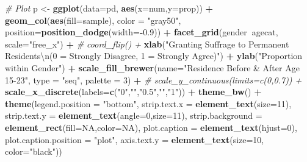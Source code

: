 \documentclass[
]{article}
\newenvironment{Shaded}{\begin{snugshade}}{\end{snugshade}}
\newcommand{\CharTok}[1]{\textcolor[rgb]{0.31,0.60,0.02}{#1}}
\newcommand{\CommentTok}[1]{\textcolor[rgb]{0.56,0.35,0.01}{\textit{#1}}}
\newcommand{\DataTypeTok}[1]{\textcolor[rgb]{0.13,0.29,0.53}{#1}}
\newcommand{\DecValTok}[1]{\textcolor[rgb]{0.00,0.00,0.81}{#1}}
\newcommand{\FloatTok}[1]{\textcolor[rgb]{0.00,0.00,0.81}{#1}}
\newcommand{\KeywordTok}[1]{\textcolor[rgb]{0.13,0.29,0.53}{\textbf{#1}}}
\newcommand{\NormalTok}[1]{#1}
\newcommand{\OperatorTok}[1]{\textcolor[rgb]{0.81,0.36,0.00}{\textbf{#1}}}
\newcommand{\OtherTok}[1]{\textcolor[rgb]{0.56,0.35,0.01}{#1}}
\newcommand{\StringTok}[1]{\textcolor[rgb]{0.31,0.60,0.02}{#1}}
\begin{document}
\begin{Shaded}
\begin{Highlighting}[]
\CommentTok{# Plot}
\NormalTok{p <-}\StringTok{ }\KeywordTok{ggplot}\NormalTok{(}\DataTypeTok{data=}\NormalTok{pd, }\KeywordTok{aes}\NormalTok{(}\DataTypeTok{x=}\NormalTok{num,}\DataTypeTok{y=}\NormalTok{prop)) }\OperatorTok{+}\StringTok{ }
\StringTok{  }\KeywordTok{geom_col}\NormalTok{(}\KeywordTok{aes}\NormalTok{(}\DataTypeTok{fill=}\NormalTok{sample), }\DataTypeTok{color =} \StringTok{"gray50"}\NormalTok{, }\DataTypeTok{position=}\KeywordTok{position_dodge}\NormalTok{(}\DataTypeTok{width=}\OperatorTok{-}\FloatTok{0.9}\NormalTok{)) }\OperatorTok{+}\StringTok{  }
\StringTok{  }\KeywordTok{facet_grid}\NormalTok{(gender}\OperatorTok{~}\NormalTok{agecat, }\DataTypeTok{scale=}\StringTok{"free_x"}\NormalTok{) }\OperatorTok{+}
\StringTok{  }\CommentTok{# coord_flip() + }
\StringTok{  }\KeywordTok{xlab}\NormalTok{(}\StringTok{"Granting Suffrage to Permanent Residents}\CharTok{\textbackslash{}n}\StringTok{(0 = Strongly Disagree, 1 = Strongly Agree)"}\NormalTok{) }\OperatorTok{+}\StringTok{ }
\StringTok{  }\KeywordTok{ylab}\NormalTok{(}\StringTok{"Proportion within Gender"}\NormalTok{) }\OperatorTok{+}
\StringTok{  }\KeywordTok{scale_fill_brewer}\NormalTok{(}\DataTypeTok{name=}\StringTok{"Residence Before & After Age 15-23"}\NormalTok{, }\DataTypeTok{type =} \StringTok{"seq"}\NormalTok{, }\DataTypeTok{palette =} \DecValTok{3}\NormalTok{) }\OperatorTok{+}\StringTok{ }
\StringTok{  }\CommentTok{# scale_y_continuous(limits=c(0,0.7)) +}
\StringTok{  }\KeywordTok{scale_x_discrete}\NormalTok{(}\DataTypeTok{labels=}\KeywordTok{c}\NormalTok{(}\StringTok{"0"}\NormalTok{,}\StringTok{""}\NormalTok{,}\StringTok{"0.5"}\NormalTok{,}\StringTok{""}\NormalTok{,}\StringTok{"1"}\NormalTok{)) }\OperatorTok{+}\StringTok{ }
\StringTok{  }\KeywordTok{theme_bw}\NormalTok{() }\OperatorTok{+}\StringTok{ }
\StringTok{  }\KeywordTok{theme}\NormalTok{(}\DataTypeTok{legend.position =} \StringTok{"bottom"}\NormalTok{,}
        \DataTypeTok{strip.text.x =} \KeywordTok{element_text}\NormalTok{(}\DataTypeTok{size=}\DecValTok{11}\NormalTok{),}
        \DataTypeTok{strip.text.y =} \KeywordTok{element_text}\NormalTok{(}\DataTypeTok{angle=}\DecValTok{0}\NormalTok{,}\DataTypeTok{size=}\DecValTok{11}\NormalTok{),}
        \DataTypeTok{strip.background =} \KeywordTok{element_rect}\NormalTok{(}\DataTypeTok{fill=}\OtherTok{NA}\NormalTok{,}\DataTypeTok{color=}\OtherTok{NA}\NormalTok{),}
        \DataTypeTok{plot.caption =} \KeywordTok{element_text}\NormalTok{(}\DataTypeTok{hjust=}\DecValTok{0}\NormalTok{),}
        \DataTypeTok{plot.caption.position =} \StringTok{"plot"}\NormalTok{,}
        \DataTypeTok{axis.text.y =} \KeywordTok{element_text}\NormalTok{(}\DataTypeTok{size=}\DecValTok{10}\NormalTok{, }\DataTypeTok{color=}\StringTok{"black"}\NormalTok{))}
\end{Highlighting}
\end{Shaded}
\end{document}
